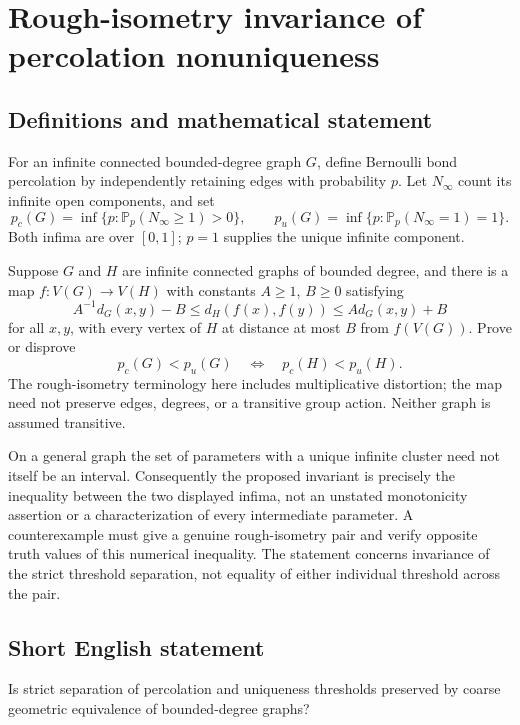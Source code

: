 \documentclass[11pt,a4paper]{article}
\begin{document}
\section*{Rough-isometry invariance of percolation nonuniqueness}\label{statement}

\subsection{Definitions and mathematical statement}
For an infinite connected bounded-degree graph $G$, define Bernoulli bond percolation by independently retaining edges with probability $p$. Let $N_\infty$ count its infinite open components, and set
\[
p_c(G)=\inf\{p:\mathbb P_p(N_\infty\ge1)>0\},\qquad
p_u(G)=\inf\{p:\mathbb P_p(N_\infty=1)=1\}.
\]
Both infima are over $[0,1]$; $p=1$ supplies the unique infinite component.

Suppose $G$ and $H$ are infinite connected graphs of bounded degree, and there is a map $f:V(G)\to V(H)$ with constants $A\ge1$, $B\ge0$ satisfying
\[
A^{-1}d_G(x,y)-B\le d_H(f(x),f(y))\le A d_G(x,y)+B
\]
for all $x,y$, with every vertex of $H$ at distance at most $B$ from $f(V(G))$. Prove or disprove
\[
p_c(G)<p_u(G)\quad\Longleftrightarrow\quad p_c(H)<p_u(H).
\]
The rough-isometry terminology here includes multiplicative distortion; the map need not preserve edges, degrees, or a transitive group action. Neither graph is assumed transitive.

On a general graph the set of parameters with a unique infinite cluster need not itself be an interval. Consequently the proposed invariant is precisely the inequality between the two displayed infima, not an unstated monotonicity assertion or a characterization of every intermediate parameter. A counterexample must give a genuine rough-isometry pair and verify opposite truth values of this numerical inequality. The statement concerns invariance of the strict threshold separation, not equality of either individual threshold across the pair.
\subsection{Short English statement}
Is strict separation of percolation and uniqueness thresholds preserved by coarse geometric equivalence of bounded-degree graphs?
\end{document}
